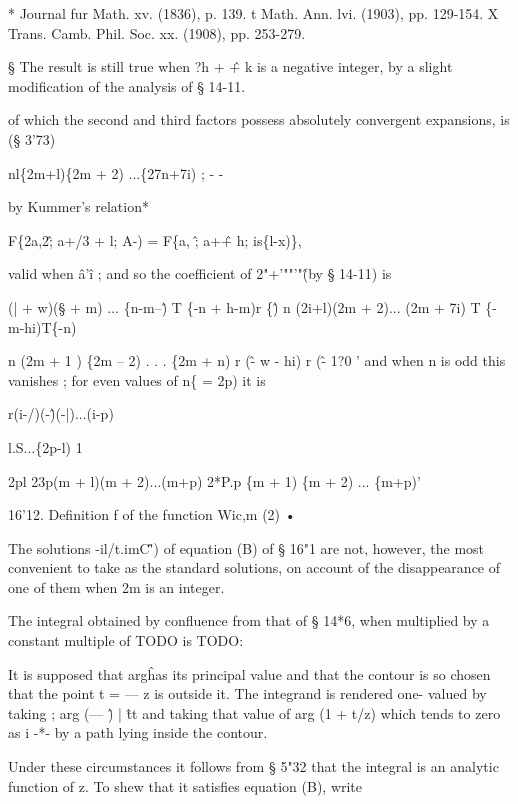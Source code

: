 * Journal fur Math. xv. (1836), p. 139. t Math. Ann. lvi. (1903), pp.
129-154. X Trans. Camb. Phil. Soc. xx. (1908), pp. 253-279.

§ The result is still true when ?h + \^ + k is a negative integer, by
a slight modification of the analysis of § 14-11.

%
%

of which the second and third factors possess absolutely convergent
expansions, is (§ 3'73)






nl\{2m+l)\{2m + 2) ...\{27n+7i) ; - -

by Kummer's relation*

F\{2a,2\^; a+/3 + l; A-) = F\{a, \^; a+\^ + h; is\{l-x)\},

valid when \^a'\^ i ; and so the coefficient of 2"+'""'"\^ (by §
14-11) is

(| + w)(§ + m) ... \{n-m--\^ ) T \{-n + h-m)r \{\^ ) n (2i+l)(2m +
2)... (2m + 7i) T \{-m-hi)T\{-n)

n (2m + 1 ) \{2m -- 2) . . . \{2m + n) r (\^ - w - hi) r (\^ - 1?0 '
and when n is odd this vanishes ; for even values of n\{ = 2p) it is

r(i-/)(-\^)(-|)...(i-p)



l.S...\{2p-l) 1



2pl 23p(m + l)(m + 2)...(m+p) 2*P.p \{m + 1) \{m + 2) ... \{m+p)'

16'12. Definition f of the function Wic,m (2) •

The solutions -il/t.imC\^') of equation (B) of § 16"1 are not,
however, the most convenient to take as the standard solutions, on
account of the disappearance of one of them when 2m is an integer.

The integral obtained by confluence from that of § 14*6, when
multiplied by a constant multiple of TODO is TODO:

It is supposed that arg\^ has its principal value and that the contour
is so chosen that the point t = — z is outside it. The integrand is
rendered one- valued by taking ; arg (— \^) | \^ tt and taking that
value of arg (1 + t/z) which tends to zero as i -*- by a path lying
inside the contour.

Under these circumstances it follows from § 5"32 that the integral is
an analytic function of z. To shew that it satisfies equation (B),
write



